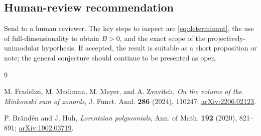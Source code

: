 \documentclass[11pt]{article}
\theoremstyle{definition}
\begin{document}
\subsection*{Human-review recommendation}

Send to a human reviewer.  The key steps to inspect are
\eqref{eq:determinant}, the use of full-dimensionality to obtain \(B>0\), and
the exact scope of the projectively-unimodular hypothesis.  If accepted, the
result is suitable as a short proposition or note; the general conjecture
should continue to be presented as open.

\begin{thebibliography}{9}

M. Fradelizi, M. Madiman, M. Meyer, and A. Zvavitch,
\emph{On the volume of the Minkowski sum of zonoids},
J. Funct. Anal. \textbf{286} (2024), 110247;
\href{https://arxiv.org/abs/2206.02123}{arXiv:2206.02123}.

P. Br\"and\'en and J. Huh,
\emph{Lorentzian polynomials},
Ann. of Math. \textbf{192} (2020), 821--891;
\href{https://arxiv.org/abs/1902.03719}{arXiv:1902.03719}.

\end{thebibliography}
\end{document}
